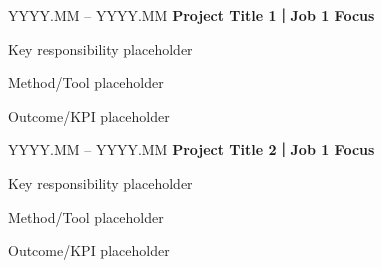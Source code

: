 \begin{twocolentry}{YYYY.MM -- YYYY.MM}
  \textbf{Project Title 1｜Job 1 Focus}
\end{twocolentry}
\begin{onecolentry}
  \begin{highlights}
    \item Key responsibility placeholder
    \item Method/Tool placeholder
    \item Outcome/KPI placeholder
  \end{highlights}
\end{onecolentry}
\vspace{0.20 cm}

\begin{twocolentry}{YYYY.MM -- YYYY.MM}
  \textbf{Project Title 2｜Job 1 Focus}
\end{twocolentry}
\begin{onecolentry}
  \begin{highlights}
    \item Key responsibility placeholder
    \item Method/Tool placeholder
    \item Outcome/KPI placeholder
  \end{highlights}
\end{onecolentry}
\vspace{0.20 cm}